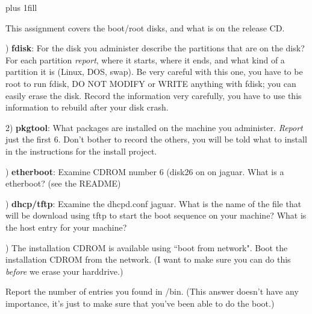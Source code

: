 
\rightskip=0pt plus 1fill

\parindent 0pt

This assignment covers the boot/root disks, and what is on the release CD.

) {\bf fdisk}:
For the disk you administer describe the partitions that are on the disk?
For each partition {\it report}, where it starts, where it ends, and what kind
of a partition it is (Linux, DOS, swap).
Be very careful with this one, you have to be root to run fdisk,
DO NOT MODIFY or WRITE anything with fdisk; 
you can easily erase the disk.
Record the information very carefully, you have to use this information
to rebuild after your disk crash.

2) {\bf pkgtool}:
What packages are installed on the machine you administer.
{\it Report} just the first 6. Don't bother to record the others, you will
be told what to install in the instructions for the install project.

) {\bf etherboot}:
Examine CDROM number 6 (disk26 on on {\ltt{}jaguar}.
What is a {\ltt{}etherboot}? (see the README)

) {\bf dhcp/tftp}:
Examine the {\ltt{}dhcpd.conf} {\ltt{}jaguar}.
What is the name of the file that will be download using tftp to
start the boot sequence on your machine?
What is the host entry for your machine?

) The installation CDROM is available using ``boot from network".
Boot the installation CDROM from the network. (I want to make sure
you can do this {\it before} we erase your harddrive.)

Report the number of entries you found in {\ltt{}/bin}.
(This answer doesn't have any importance, it's just to make sure
that you've been able to do the boot.)

\bye
